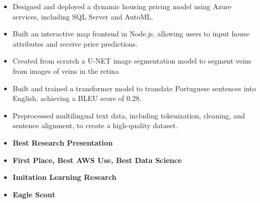 \begin{itemize}
	\item Designed and deployed a dynamic housing pricing model using Azure services, including SQL Server and AutoML.
	\item Built an interactive map frontend in Node.js, allowing users to input house attributes and receive price predictions.
\end{itemize}
\begin{itemize}
    \item Created from scratch a U-NET image segmentation model to segment veins from images of veins in the retina
\end{itemize}
\begin{itemize}
    \item Built and trained a transformer model to translate Portuguese sentences into English, achieving a BLEU score of 0.28.
    \item Preprocessed multilingual text data, including tokenization, cleaning, and sentence alignment, to create a high-quality dataset.
\end{itemize}


\begin{itemize}
	\item\bf{Best Research Presentation}
	\item\bf{First Place, Best AWS Use, Best Data Science}
	\item\bf{Imitation Learning Research}
	\item\bf{Eagle Scout}
\end{itemize}